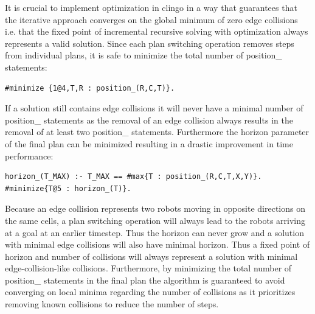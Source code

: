 \documentclass{llncs}
\begin{document}
It is crucial to implement optimization in clingo \cite{clingo} in a way that guarantees that the iterative approach converges on the global minimum of zero edge collisions i.e. that the fixed point of incremental recursive solving with optimization always represents a valid solution.
Since each plan switching operation removes steps from individual plans, it is safe to minimize the total number of position\_ statements:
\begin{verbatim}
#minimize {1@4,T,R : position_(R,C,T)}.
\end{verbatim}
If a solution still contains edge collisions it will never have a minimal number of position\_ statements as the removal of an edge collision always results in the removal of at least two position\_ statements.
Furthermore the horizon parameter of the final plan can be minimized resulting in a drastic improvement in time performance:
\begin{verbatim}
horizon_(T_MAX) :- T_MAX == #max{T : position_(R,C,T,X,Y)}.
#minimize{T@5 : horizon_(T)}.
\end{verbatim}
Because an edge collision represents two robots moving in opposite directions on the same cells, a plan switching operation will always lead to the robots arriving at a goal at an earlier timestep. Thus the horizon can never grow and a solution with minimal edge collisions will also have minimal horizon. Thus a fixed point of horizon and number of collisions will always represent a solution with minimal edge-collision-like collisions.
Furthermore, by minimizing the total number of position\_ statements in the final plan the algorithm is guaranteed to avoid converging on local minima regarding the number of collisions as it prioritizes removing known collisions to reduce the number of steps.
\end{document}
